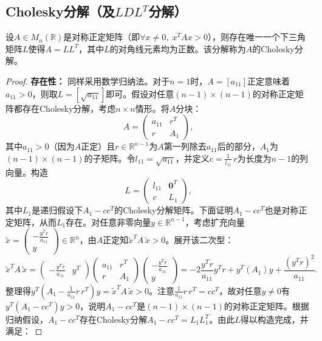 \subsection{Cholesky分解（及$LDL^T$分解）}
\begin{theorem}\label{theo:Cholesky}
	设$A\in M_{n}(\mathbb{R})$是对称正定矩阵（即$\forall x\neq 0,\;x^T A x>0$），则存在唯一一个下三角矩阵$L$使得$A=LL^T$，其中$L$的对角线元素均为正数。该分解称为$A$的Cholesky分解。
\end{theorem}
\begin{proof}
	\textbf{存在性：} 同样采用数学归纳法。对于$n=1$时，$A=[a_{11}]$正定意味着$a_{11}>0$，则取$L=[\sqrt{a_{11}}]$即可。假设对任意$(n-1)\times(n-1)$的对称正定矩阵都存在Cholesky分解，考虑$n\times n$情形。将$A$分块：
	\[ A = \begin{pmatrix} 
		a_{11} & r^T \\[6pt]
		r & A_1 
	\end{pmatrix},\] 
	其中$a_{11}>0$（因为$A$正定）且$r\in \mathbb{R}^{n-1}$为$A$第一列除去$a_{11}$后的部分，$A_1$为$(n-1)\times(n-1)$的子矩阵。令$l_{11}=\sqrt{a_{11}}$，并定义$c=\frac{1}{l_{11}}\,r$为长度为$n-1$的列向量。构造
	\[ L = \begin{pmatrix}
		l_{11} & \mathbf{0}^T \\
		c & L_1
	\end{pmatrix}, \] 
	其中$L_1$是递归假设下$A_1 - cc^T$的Cholesky分解矩阵。下面证明$A_1-cc^T$也是对称正定矩阵，从而$L_1$存在。对任意非零向量$y\in \mathbb{R}^{n-1}$，考虑扩充向量$\tilde{x}=\begin{pmatrix}-\frac{y^T r}{a_{11}} \\[3pt] y\end{pmatrix}\in \mathbb{R}^n$，由$A$正定知$\tilde{x}^T A\, \tilde{x}>0$。展开该二次型：
	\[
	\tilde{x}^T A\,\tilde{x} = \begin{pmatrix} -\frac{y^T r}{a_{11}} & y^T \end{pmatrix} 
	\begin{pmatrix} a_{11} & r^T \\ r & A_1 \end{pmatrix} 
	\begin{pmatrix} -\frac{y^T r}{a_{11}} \\[4pt] y \end{pmatrix}
	= -2\frac{y^T r}{a_{11}}y^T r + y^T (A_1)y + \frac{(y^T r)^2}{a_{11}}. 
	\] 
	整理得$y^T (A_1 - \frac{1}{a_{11}} r\,r^T)y = \tilde{x}^T A\,\tilde{x} > 0$。注意$\frac{1}{a_{11}}r\,r^T = cc^T$，故对任意$y\neq 0$有$y^T(A_1 - cc^T)y>0$，说明$A_1-cc^T$是$(n-1)\times(n-1)$的对称正定矩阵。根据归纳假设，$A_1-cc^T$存在Cholesky分解$A_1-cc^T = L_1 L_1^T$。由此$L$得以构造完成，并满足：

\end{proof}
